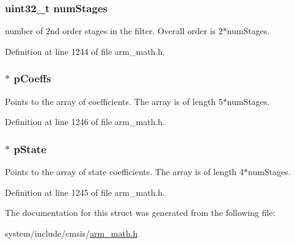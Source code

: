 \subsubsection[{\texorpdfstring{num\+Stages}{numStages}}]{\setlength{\rightskip}{0pt plus 5cm}uint32\+\_\+t num\+Stages}\hypertarget{structarm__biquad__casd__df1__inst__f32_aed9c8a6224cd149e8e12b17b25b9b767}{}\label{structarm__biquad__casd__df1__inst__f32_aed9c8a6224cd149e8e12b17b25b9b767}
number of 2nd order stages in the filter. Overall order is 2$\ast$num\+Stages. 

Definition at line 1244 of file arm\+\_\+math.\+h.

\subsubsection[{\texorpdfstring{p\+Coeffs}{pCoeffs}}]{$\ast$ p\+Coeffs}\hypertarget{structarm__biquad__casd__df1__inst__f32_aacbb8dd8eeba4b21fc2bb40076405ee3}{}\label{structarm__biquad__casd__df1__inst__f32_aacbb8dd8eeba4b21fc2bb40076405ee3}
Points to the array of coefficients. The array is of length 5$\ast$num\+Stages. 

Definition at line 1246 of file arm\+\_\+math.\+h.

\subsubsection[{\texorpdfstring{p\+State}{pState}}]{$\ast$ p\+State}\hypertarget{structarm__biquad__casd__df1__inst__f32_a335c87e6fdc4b96601d95a5de8b9c463}{}\label{structarm__biquad__casd__df1__inst__f32_a335c87e6fdc4b96601d95a5de8b9c463}
Points to the array of state coefficients. The array is of length 4$\ast$num\+Stages. 

Definition at line 1245 of file arm\+\_\+math.\+h.



The documentation for this struct was generated from the following file\+:\begin{DoxyCompactItemize}
\item 
system/include/cmsis/\hyperlink{arm__math_8h}{arm\+\_\+math.\+h}\end{DoxyCompactItemize}
